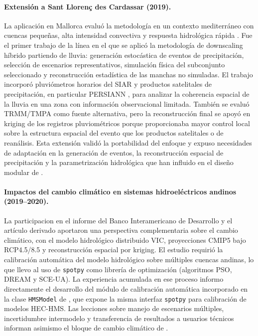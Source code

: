\paragraph{Extensión a Sant Llorenç des Cardassar (2019).}
La aplicación en Mallorca evaluó la metodología en un contexto mediterráneo con cuencas pequeñas, alta intensidad convectiva y respuesta hidrológica rápida \parencite{navas2019mallorca}. Fue el primer trabajo de la línea en el que se aplicó la metodología de downscaling híbrido partiendo de lluvia: generación estocástica de eventos de precipitación, selección de escenarios representativos, simulación física del subconjunto seleccionado y reconstrucción estadística de las manchas no simuladas. El trabajo incorporó pluviómetros horarios del SIAR y productos satelitales de precipitación, en particular PERSIANN \parencite{ashouri2015persiann}, para analizar la coherencia espacial de la lluvia en una zona con información observacional limitada. También se evaluó TRMM/TMPA \parencite{huffman2007trmm} como fuente alternativa, pero la reconstrucción final se apoyó en kriging de los registros pluviométricos porque proporcionaba mayor control local sobre la estructura espacial del evento que los productos satelitales o de reanálisis. Esta extensión validó la portabilidad del enfoque y expuso necesidades de adaptación en la generación de eventos, la reconstrucción espacial de precipitación y la parametrización hidrológica que han influido en el diseño modular de \hydra.

\paragraph{Impactos del cambio climático en sistemas hidroeléctricos andinos (2019--2020).}
La participacion en el informe del Banco Interamericano de Desarrollo \parencite{paz2019idb} y el artículo derivado \parencite{deljesus2020andinos} aportaron una perspectiva complementaria sobre el cambio climático, con el modelo hidrológico distribuido VIC, proyecciones CMIP5 bajo RCP4.5/8.5 y reconstrucción espacial por kriging. El estudio requirió la calibración automática del modelo hidrológico sobre múltiples cuencas andinas, lo que llevo al uso de \texttt{spotpy} \parencite{houska2015spotpy} como librería de optimización (algoritmos PSO, DREAM y SCE-UA). La experiencia acumulada en ese proceso informo directamente el desarrollo del módulo de calibración automática incorporado en la clase \texttt{HMSModel} de \hydra, que expone la misma interfaz \texttt{spotpy} para calibración de modelos HEC-HMS. Las lecciones sobre manejo de escenarios múltiples, incertidumbre intermodelo y transferencia de resultados a usuarios técnicos informan asimismo el bloque de cambio climático de \hydra.

